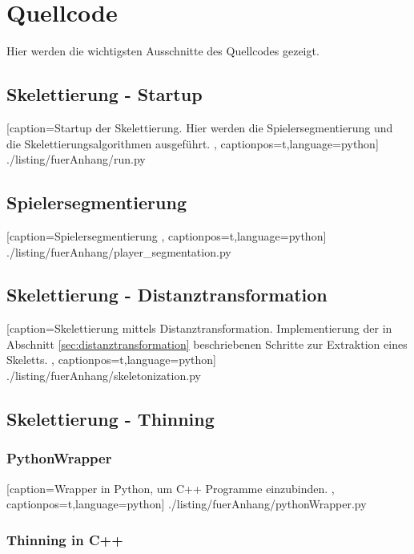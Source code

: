 \chapter{Quellcode}
\label{anhang:quellcode}
Hier werden die wichtigsten Ausschnitte des Quellcodes gezeigt. 
\section{Skelettierung - Startup}
 
    [caption={Startup der Skelettierung. Hier werden die Spielersegmentierung und die Skelettierungsalgorithmen ausgeführt.}
       \label{lst:startup},
       captionpos=t,language=python]
 {./listing/fuerAnhang/run.py}
\section{Spielersegmentierung}
\label{anhang:segmentierung}

    [caption={Spielersegmentierung}
       \label{lst:anhang_spielersegmentierung},
       captionpos=t,language=python]
 {./listing/fuerAnhang/player_segmentation.py}
\section{Skelettierung - Distanztransformation}

    [caption={Skelettierung mittels Distanztransformation. Implementierung der in Abschnitt \ref{sec:distanztransformation} beschriebenen Schritte zur Extraktion eines Skeletts.}
       \label{lst:anhang_distanztransformation},
       captionpos=t,language=python]
 {./listing/fuerAnhang/skeletonization.py}
\section{Skelettierung - Thinning}
\subsection{PythonWrapper}

    [caption={Wrapper in Python, um C++ Programme einzubinden.}
       \label{lst:pythonwrapper},
       captionpos=t,language=python]
 {./listing/fuerAnhang/pythonWrapper.py}
\subsection{Thinning in C++}

